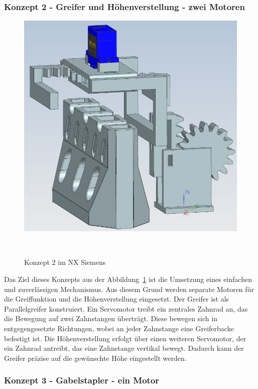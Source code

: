 \documentclass[main.tex]{subfiles} %
\begin{document}
\subsubsection*{Konzept 2 - Greifer und Höhenverstellung - zwei Motoren}

\begin{figure}[H]
    \centering
    \includegraphics[width=1\textwidth]{Konzept_2_Greifer.jpg}
    \caption{Konzept 2 im NX Siemens}~\label{fig:Konzept_2}
\end{figure}

Das Ziel dieses Konzepts aus der Abbildung~\ref{fig:Konzept_2} ist die Umsetzung eines einfachen und zuverlässigen Mechanismus. Aus diesem Grund werden separate Motoren 
für die Greiffunktion und die Höhenverstellung eingesetzt.
Der Greifer ist als Parallelgreifer konstruiert. Ein Servomotor treibt ein zentrales Zahnrad an, das die Bewegung auf 
zwei Zahnstangen überträgt. Diese bewegen sich in entgegengesetzte Richtungen, wobei an jeder Zahnstange eine Greiferbacke befestigt ist.
Die Höhenverstellung erfolgt über einen weiteren Servomotor, der ein Zahnrad antreibt, das eine Zahnstange vertikal bewegt. 
Dadurch kann der Greifer präzise auf die gewünschte Höhe eingestellt werden.


\subsubsection*{Konzept 3 - Gabelstapler - ein Motor}
\end{document}
